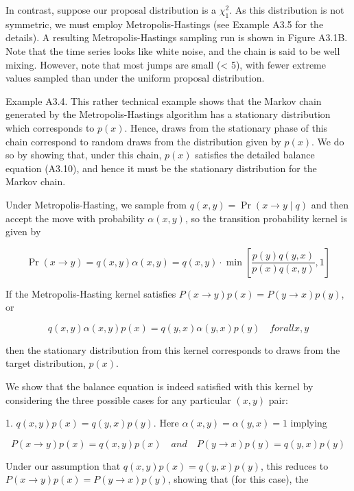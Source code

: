 \documentclass{article}
\begin{document}
In contrast, suppose our proposal distribution is a  $ \chi_1^2 $. As this distribution is not symmetric, we must employ Metropolis-Hastings (see Example A3.5 for the details). A resulting Metropolis-Hastings sampling run is shown in Figure A3.1B. Note that the time series looks like white noise, and the chain is said to be well mixing. However, note that most jumps are small (< 5), with fewer extreme values sampled than under the uniform proposal distribution.

Example A3.4. This rather technical example shows that the Markov chain generated by the Metropolis-Hastings algorithm has a stationary distribution which corresponds to  $ p(x) $. Hence, draws from the stationary phase of this chain correspond to random draws from the distribution given by  $ p(x) $. We do so by showing that, under this chain,  $ p(x) $ satisfies the detailed balance equation (A3.10), and hence it must be the stationary distribution for the Markov chain.

Under Metropolis-Hasting, we sample from  $ q(x, y) = \Pr(x \to y \mid q) $ and then accept the move with probability  $ \alpha(x, y) $, so the transition probability kernel is given by

\begin{equation}
\Pr(x\rightarrow y)=q(x,y)\alpha(x,y)=q(x,y)\cdot\min\left[\frac{p(y)q(y,x)}{p(x)q(x,y)},1\right]
\end{equation}

If the Metropolis-Hasting kernel satisfies  $ P(x \to y) p(x) = P(y \to x) p(y) $, or

\begin{equation}
q(x,y)\alpha(x,y)p(x)=q(y,x)\alpha(y,x)p(y)\quad for all x,y
\end{equation}

then the stationary distribution from this kernel corresponds to draws from the target distribution,  $ p(x) $.

We show that the balance equation is indeed satisfied with this kernel by considering the three possible cases for any particular  $ (x, y) $ pair:

1.  $  q(x, y) p(x) = q(y, x) p(y)  $. Here  $  \alpha(x, y) = \alpha(y, x) = 1  $ implying

\begin{equation}
P(x\rightarrow y)p(x)=q(x,y)p(x)\quad and\quad P(y\rightarrow x)p(y)=q(y,x)p(y)
\end{equation}

Under our assumption that  $  q(x, y) p(x) = q(y, x) p(y)  $, this reduces to  $  P(x \to y) p(x) = P(y \to x) p(y)  $, showing that (for this case), the
\end{document}

